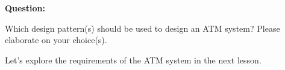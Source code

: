 \textbf{Question:}

Which design pattern(s) should be used to design an ATM system? Please elaborate on your choice(s).

Let's explore the requirements of the ATM system in the next lesson.

\subsection{}\label{O2Rf8oUfIWpiPVHb-pkAy}

